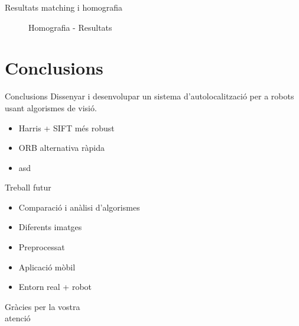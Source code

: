 \documentclass[xcolor=table, 11pt]{beamer}
\newcommand\tz{\fontsize{13}{15.6}\selectfont}
\begin{document}
	\begin{frame}{Resultats matching i homografia}
		\tz
		\begin{figure}[!htb]
			\par
			\caption{Homografia - Resultats}
		\end{figure}
	\end{frame}


\section{Conclusions}

	\begin{frame}{Conclusions}
		\tz
		Dissenyar i desenvolupar un sistema d'autolocalització per a robots usant algorismes de visió.\\
		\vspace{1em}

		\begin{itemize}
			\item Harris + SIFT més robust
			\item ORB alternativa ràpida
			\item asd
		\end{itemize}
	\end{frame}

	\begin{frame}{Treball futur}
		\tz
		\begin{itemize}
			\item{Comparació i anàlisi d'algorismes}
			\item{Diferents imatges}
			\item{Preprocessat}
			\item{Aplicació mòbil}
			\item{Entorn real + robot}
		\end{itemize}
	\end{frame}

	\begin{frame}
		\Huge{Gràcies per la vostra\\atenció}
	\end{frame}

	\appendix

	\begin{frame}[allowframebreaks]
		\printbibliography
	\end{frame}
\end{document}
